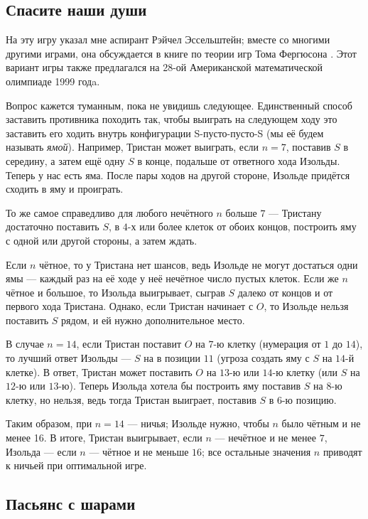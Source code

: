 \subsection*{Спасите наши души}

На эту игру указал мне аспирант Рэйчел Эссельштейн;
вместе со многими другими играми, она обсуждается в книге по теории игр Тома Фергюсона \cite{ferguson}.
Этот вариант игры также предлагался на 28-ой Американской математической олимпиаде 1999 годa.

Вопрос кажется туманным, пока не увидишь следующее.
Единственный способ заставить противника походить так, чтобы выиграть на следующем ходу это заставить его ходить внутрь конфигурации S-пусто-пусто-S (мы её будем называть \emph{ямой}).
Например, Тристан может выиграть, если $n = 7$, поставив $S$ в середину, а затем ещё одну $S$ в конце, подальше от ответного хода Изольды.
Теперь у нас есть яма.
После пары ходов на другой стороне, Изольде придётся сходить в яму и проиграть.

То же самое справедливо для любого нечётного $n$ больше $7$ --- Тристану достаточно поставить $S$, в $4$-х или более клеток от обоих концов, построить яму с одной или другой стороны, а затем ждать.

Если $n$ чётное, то у Тристана нет шансов, ведь Изольде не могут достаться одни ямы --- каждый раз на её ходе у неё нечётное число пустых клеток.
Если же $n$ чётное и большое, то Изольда выигрывает, сыграв $S$ далеко от концов и от первого хода Тристана.
Однако, если Тристан начинает с $O$, то Изольде нельзя поставить $S$ рядом, и ей нужно дополнительное место.

В случае $n = 14$, если Тристан поставит $O$ на $7$-ю клетку (нумерация от $1$ до $14$), то лучший ответ Изольды --- $S$ на в позиции $11$ (угроза создать яму с $S$ на $14$-й клетке).
В ответ, Тристан может поставить $O$ на $13$-ю или $14$-ю клетку (или $S$ на $12$-ю или $13$-ю). 
Теперь Изольда хотела бы построить яму поставив $S$ на $8$-ю клетку, но нельзя, ведь тогда Тристан выиграет, поставив $S$ в $6$-ю позицию.

Таким образом, при $n = 14$ --- ничья;
Изольде нужно, чтобы $n$ было чётным и не менее 16.
В итоге, Тристан выигрывает, если $n$ --- нечётное и не менее $7$,
Изольда --- если $n$ --- чётное и не меньше $16$;
все остальные значения $n$ приводят к ничьей при оптимальной игре.

\subsection*{Пасьянс с шарами}

